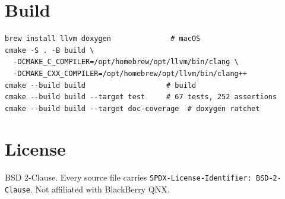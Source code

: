 \documentclass[11pt]{article}
\begin{document}
\section{Build}

\begin{Verbatim}[fontsize=\small,frame=single]
brew install llvm doxygen              # macOS
cmake -S . -B build \
  -DCMAKE_C_COMPILER=/opt/homebrew/opt/llvm/bin/clang \
  -DCMAKE_CXX_COMPILER=/opt/homebrew/opt/llvm/bin/clang++
cmake --build build                   # build
cmake --build build --target test     # 67 tests, 252 assertions
cmake --build build --target doc-coverage  # doxygen ratchet
\end{Verbatim}

\section{License}

BSD 2-Clause.  Every source file carries
\texttt{SPDX-License-Identifier: BSD-2-Clause}.
Not affiliated with BlackBerry QNX.
\end{document}
